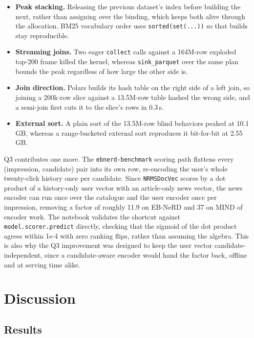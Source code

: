 \documentclass[11pt]{article}
\newcommand{\code}[1]{%
    \colorbox{gray!40}{\texttt{#1}}%
}
\begin{document}
\begin{itemize}\itemsep2pt
\item \textbf{Peak stacking.} Releasing the previous dataset's index before
building the next, rather than assigning over the binding, which keeps both
alive through the allocation. BM25 vocabulary order uses
\code{sorted(set(...))} so that builds stay reproducible.
\item \textbf{Streaming joins.} Two eager \code{collect} calls against a
164M-row exploded top-200 frame killed the kernel, whereas
\code{sink\_parquet} over the same plan bounds the peak regardless of how
large the other side is.
\item \textbf{Join direction.} Polars builds its hash table on the right side
of a left join, so joining a 200k-row slice against a 13.5M-row table hashed
the wrong side, and a semi-join first cuts it to the slice's rows in 0.3\,s.
\item \textbf{External sort.} A plain sort of the 13.5M-row blind behaviors
peaked at 10.1\,GB, whereas a range-bucketed external sort reproduces it
bit-for-bit at 2.55\,GB.
\end{itemize}

Q3 contributes one more. The \code{ebnerd-benchmark} scoring path flattens
every (impression, candidate) pair into its own row, re-encoding the user's
whole twenty-click history once per candidate. Since \code{NRMSDocVec} scores
by a dot product of a history-only user vector with an article-only news
vector, the news encoder can run once over the catalogue and the user encoder
once per impression, removing a factor of roughly 11.9 on EB-NeRD and 37 on
MIND of encoder work. The notebook validates the shortcut against
\code{model.scorer.predict} directly, checking that the sigmoid of the dot
product agrees within 1e-4 with zero ranking flips, rather than assuming the
algebra. This is also why the Q3 improvement was designed to keep the user
vector candidate-independent, since a candidate-aware encoder would hand the
factor back, offline and at serving time alike.

\section{Discussion}
\label{sec:discussion}

\subsection{Results}
\label{sec:results}
\end{document}

